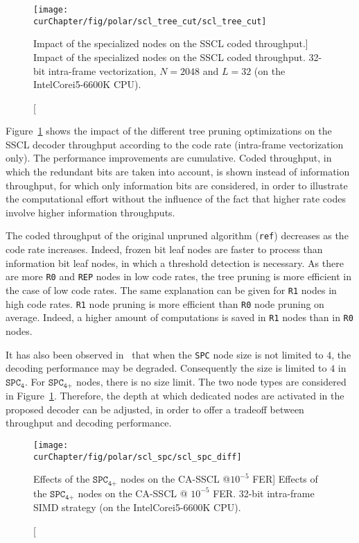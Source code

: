\begin{figure}[htp]
  \centering
  \texttt{[image: \\curChapter/fig/polar/scl\_tree\_cut/scl\_tree\_cut]}
  \caption
    [Impact of the specialized nodes on the SSCL coded throughput.]
    {Impact of the specialized nodes on the SSCL coded throughput.
    32-bit intra-frame vectorization, $N=2048$ and $L=32$
    (on the Intel\R Core\TM i5-6600K CPU).}
  \label{plot:opt_polar_scl_tree_cut}
\end{figure}

Figure~\ref{plot:opt_polar_scl_tree_cut} shows the impact of the different tree
pruning optimizations on the SSCL decoder throughput according to the code
rate (intra-frame vectorization only). The performance improvements are
cumulative. Coded throughput, in which the redundant bits are taken into
account, is shown instead of information throughput, for which only information
bits are considered, in order to illustrate the computational effort without the
influence of the fact that higher rate codes involve higher information
throughputs.

The coded throughput of the original unpruned algorithm (\verb|ref|) decreases
as the code rate increases. Indeed, frozen bit leaf nodes are faster to process
than information bit leaf nodes, in which a threshold detection is necessary. As
there are more \verb|R0| and \verb|REP| nodes in low code rates, the tree
pruning is more efficient in the case of low code rates. The same explanation
can be given for \verb|R1| nodes in high code rates. \verb|R1| node pruning is
more efficient than \verb|R0| node pruning on average. Indeed, a higher amount
of computations is saved in \verb|R1| nodes than in \verb|R0| nodes.

It has also been observed in~\cite{Sarkis2016} that when the \verb|SPC| node
size is not limited to $4$, the decoding performance may be degraded.
Consequently the size is limited to $4$ in $\texttt{SPC}_\texttt{4}$. For
$\texttt{SPC}_\texttt{4+}$ nodes, there is no size limit. The two node types are
considered in Figure~\ref{plot:opt_polar_scl_tree_cut}. Therefore, the depth at
which dedicated nodes are activated in the proposed decoder can be adjusted, in
order to offer a tradeoff between throughput and decoding performance.

\begin{figure}[htp]
  \centering
  \texttt{[image: \\curChapter/fig/polar/scl\_spc/scl\_spc\_diff]}
  \caption
    [Effects of the $\texttt{SPC}_\texttt{4+}$ nodes on the CA-SSCL @$10^{-5}$
     FER]
    {Effects of the $\texttt{SPC}_\texttt{4+}$ nodes on the CA-SSCL @ $10^{-5}$
     FER. 32-bit intra-frame SIMD strategy (on the Intel\R Core\TM i5-6600K
     CPU).}
  \label{plot:opt_polar_scl_spc}
\end{figure}

